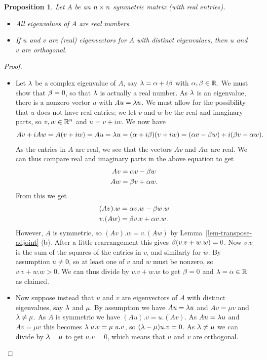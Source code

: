 \documentclass[reqno]{amsart}
\newtheorem{proposition}[theorem]{Proposition}
\theoremstyle{definition}
\begin{document}
\begin{proposition}\label{prop-symmetric-eigen}
 Let $A$ be an $n\times n$ symmetric matrix (with real entries).
 \begin{itemize}
  \item[(a)] All eigenvalues of $A$ are real numbers.
  \item[(b)] If $u$ and $v$ are (real) eigenvectors for $A$ with
   distinct eigenvalues, then $u$ and $v$ are orthogonal.
 \end{itemize}
\end{proposition}
\begin{proof}
 \begin{itemize}
  \item[(a)] Let $\lambda$ be a complex eigenvalue of $A$, say
   $\lambda=\alpha+i\beta$ with $\alpha,\beta\in{\mathbb{R}}$.  We must show that $\beta=0$, so
   that $\lambda$ is actually a real number.  As $\lambda$ is an eigenvalue,
   there is a nonzero vector $u$ with $Au=\lambda u$.  We must allow for
   the possibility that $u$ does not have real entries; we let $v$ and
   $w$ be the real and imaginary parts, so $v,w\in{\mathbb{R}}^n$ and $u=v+iw$.
   We now have
   \[ Av + iAw = A(v+iw) = Au = \lambda u =
       (\alpha+i\beta)(v+iw) = (\alpha v-\beta w)+i(\beta v+\alpha w).
   \]
   As the entries in $A$ are real, we see that the vectors $Av$ and
   $Aw$ are real.  We can thus compare real and imaginary parts in the
   above equation to get
   \begin{align*}
    Av &= \alpha v - \beta w \\
    Aw &= \beta v + \alpha w.
   \end{align*}
   From this we get
   \begin{align*}
    (Av).w &= \alpha v.w - \beta w.w \\
    v.(Aw) &= \beta v.v + \alpha v.w.
   \end{align*}
   However, $A$ is symmetric, so $(Av).w=v.(Aw)$ by
   Lemma~\ref{lem-transpose-adjoint} (b).  After a little rearrangement
   this gives $\beta(v.v+w.w)=0$.  Now $v.v$ is the sum of the squares
   of the entries in $v$, and similarly for $w$.  By assumption
   $u\neq 0$, so at least one of $v$ and $w$ must be nonzero, so
   $v.v+w.w>0$.  We can thus divide by $v.v+w.w$ to get $\beta=0$ and
   $\lambda=\alpha\in{\mathbb{R}}$ as claimed.
  \item[(b)] Now suppose instead that $u$ and $v$ are eigenvectors of
   $A$ with distinct eigenvalues, say $\lambda$ and $\mu$.  By assumption
   we have $Au=\lambda u$ and $Av=\mu v$ and $\lambda\neq\mu$.  As $A$ is
   symmetric we have $(Au).v=u.(Av)$.  As $Au=\lambda u$ and $Av=\mu v$
   this becomes $\lambda\;u.v=\mu\;u.v$, so $(\lambda-\mu)u.v=0$.  As
   $\lambda\neq\mu$ we can divide by $\lambda-\mu$ to get $u.v=0$, which means
   that $u$ and $v$ are orthogonal.
 \end{itemize}
\end{proof}
\end{document}
